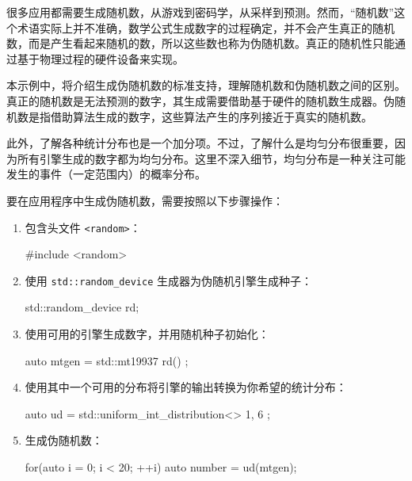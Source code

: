 

很多应用都需要生成随机数，从游戏到密码学，从采样到预测。然而，“随机数”这个术语实际上并不准确，数学公式生成数字的过程确定，并不会产生真正的随机数，而是产生看起来随机的数，所以这些数也称为伪随机数。真正的随机性只能通过基于物理过程的硬件设备来实现。


本示例中，将介绍生成伪随机数的标准支持，理解随机数和伪随机数之间的区别。真正的随机数是无法预测的数字，其生成需要借助基于硬件的随机数生成器。伪随机数是指借助算法生成的数字，这些算法产生的序列接近于真实的随机数。

此外，了解各种统计分布也是一个加分项。不过，了解什么是均匀分布很重要，因为所有引擎生成的数字都为均匀分布。这里不深入细节，均匀分布是一种关注可能发生的事件（一定范围内）的概率分布。


要在应用程序中生成伪随机数，需要按照以下步骤操作：

\begin{enumerate}
\item
包含头文件 \verb|<random>|：

\begin{cpp}
#include <random>
\end{cpp}

\item
使用 \verb|std::random_device| 生成器为伪随机引擎生成种子：

\begin{cpp}
std::random_device rd{};
\end{cpp}

\item
使用可用的引擎生成数字，并用随机种子初始化：

\begin{cpp}
auto mtgen = std::mt19937{ rd() };
\end{cpp}

\item
使用其中一个可用的分布将引擎的输出转换为你希望的统计分布：

\begin{cpp}
auto ud = std::uniform_int_distribution<>{ 1, 6 };
\end{cpp}

\item
生成伪随机数：

\begin{cpp}
for(auto i = 0; i < 20; ++i)
    auto number = ud(mtgen);
\end{cpp}
\end{enumerate}

